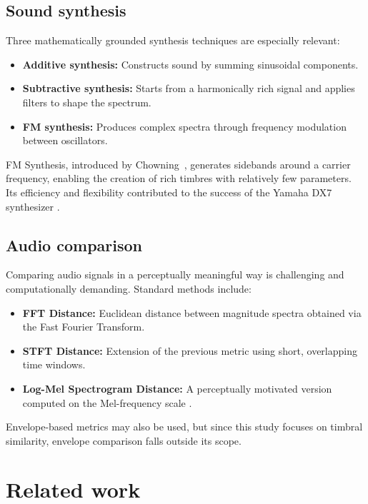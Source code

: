 \documentclass[10pt,conference]{IEEEtran}
\begin{document}
\subsection{Sound synthesis}

Three mathematically grounded synthesis techniques are especially relevant:

\begin{itemize}
    \item \textbf{Additive synthesis:} Constructs sound by summing sinusoidal components.
    \item \textbf{Subtractive synthesis:} Starts from a harmonically rich signal and applies filters to shape the spectrum.
    \item \textbf{FM synthesis:} Produces complex spectra through frequency modulation between oscillators.
\end{itemize}

FM Synthesis, introduced by Chowning~\cite{chowning1973synthesis}, generates sidebands around a carrier frequency, enabling the creation of rich timbres with relatively few parameters. Its efficiency and flexibility contributed to the success of the Yamaha DX7 synthesizer \cite{steinmetz2022ddx7, lazzarini2023higherorder}.

\subsection{Audio comparison}

Comparing audio signals in a perceptually meaningful way is challenging and computationally demanding. Standard methods \cite{claesson2021resynthesis} include:

\begin{itemize}
    \item \textbf{FFT Distance:} Euclidean distance between magnitude spectra obtained via the Fast Fourier Transform.
    \item \textbf{STFT Distance:} Extension of the previous metric using short, overlapping time windows.
    \item \textbf{Log-Mel Spectrogram Distance:} A perceptually motivated version computed on the Mel-frequency scale \cite{claesson2021resynthesis,chulev2024improving}.
\end{itemize}

Envelope-based metrics may also be used, but since this study focuses on timbral similarity, envelope comparison falls outside its scope.

\section{Related work} \label{sec:related}
\end{document}
